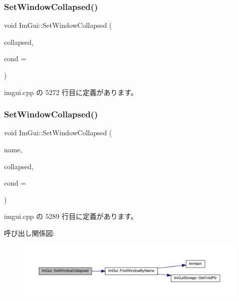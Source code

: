 \subsubsection{\texorpdfstring{Set\+Window\+Collapsed()}{SetWindowCollapsed()}\hspace{0.1cm}{\footnotesize\ttfamily [1/2]}}
{\footnotesize\ttfamily void Im\+Gui\+::\+Set\+Window\+Collapsed (\begin{DoxyParamCaption}\item[{bool}]{collapsed,  }\item[{\mbox{\hyperlink{imgui_8h_aef890d6ac872e12c5804d0b3e4f7f103}{Im\+Gui\+Cond}}}]{cond = {} }\end{DoxyParamCaption})}



 imgui.\+cpp の 5272 行目に定義があります。

\mbox{\label{namespace_im_gui_ac349187d6aae141cd3b4476e54bcc338}} 
\subsubsection{\texorpdfstring{Set\+Window\+Collapsed()}{SetWindowCollapsed()}\hspace{0.1cm}{\footnotesize\ttfamily [2/2]}}
{\footnotesize\ttfamily void Im\+Gui\+::\+Set\+Window\+Collapsed (\begin{DoxyParamCaption}\item[{const char $\ast$}]{name,  }\item[{bool}]{collapsed,  }\item[{\mbox{\hyperlink{imgui_8h_aef890d6ac872e12c5804d0b3e4f7f103}{Im\+Gui\+Cond}}}]{cond = {} }\end{DoxyParamCaption})}



 imgui.\+cpp の 5289 行目に定義があります。

呼び出し関係図\+:\nopagebreak
\begin{figure}[H]
\begin{center}
\leavevmode
\includegraphics[width=350pt]{namespace_im_gui_ac349187d6aae141cd3b4476e54bcc338_cgraph}
\end{center}
\end{figure}
\mbox{\label{namespace_im_gui_ac71920931ed7b7c8594ee84c6a94e7b8}} 
